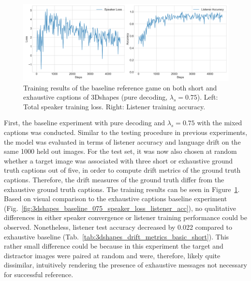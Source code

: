 \begin{figure}[h]
	\centering
	\includegraphics[width=\linewidth]{images/3dshapes_wShort_baseline_random_075_losses.png}
	\caption{Training results of the baseline reference game on both short and exhaustive captions of 3Dshapes (pure decoding, $\lambda_s=0.75$). Left: Total speaker training loss. Right: Listener training accuracy.}
	\label{fig:3dshapes_wShort_075_speaker_losses_listener_acc}
\end{figure}

First, the baseline experiment with pure decoding and $\lambda_s = 0.75$ with the mixed captions was conducted. Similar to the testing procedure in previous experiments, the model was evaluated in terms of listener accuracy and language drift on the same 1000 held out images. For the test set, it was now also chosen at random whether a target image was associated with three short or exhaustive ground truth captions out of five, in order to compute drift metrics of the ground truth captions. Therefore, the drift measures of the ground truth differ from the exhaustive ground truth captions.
The training results can be seen in Figure~\ref{fig:3dshapes_wShort_075_speaker_losses_listener_acc}. Based on visual comparison to the exhaustive captions baseline experiment (Fig.~\ref{fig:3dshapes_baseline_075_speaker_loss_listener_acc}), no qualitative differences in either speaker convergence or listener training performance could be observed. Nonetheless, listener test accuracy decreased by 0.022 compared to exhaustive baseline (Tab.~\ref{tab:3dshapes_drift_metrics_basic_short}).
This rather small difference could be because in this experiment the target and distractor images were paired at random and were, therefore, likely quite dissimilar, intuitively rendering the presence of exhaustive messages not necessary for successful reference.

